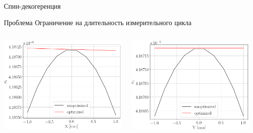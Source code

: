 \documentclass[14pt]{beamer}
\begin{document}
\begin{frame}{Спин-декогеренция}\centering
	\begin{block}{Проблема}
		Ограничение на длительность измерительного цикла
	\end{block}
\begin{columns}
	\begin{column}{.5\linewidth}
		\includegraphics[width=\linewidth]{decoh_sim/spin_tune_decoh_x_offset}
	\end{column}
	\begin{column}{.5\linewidth}
		\includegraphics[width=\linewidth]{decoh_sim/spin_tune_decoh_y_offset}
	\end{column}
\end{columns}
\end{frame}
\end{document}
